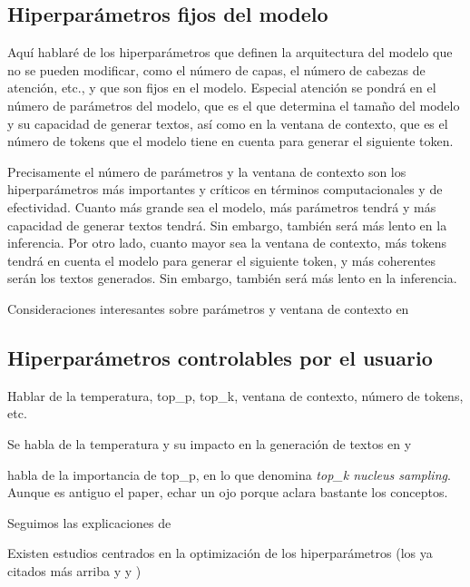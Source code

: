 \subsection{Hiperparámetros fijos del modelo}
Aquí hablaré de los hiperparámetros que definen la arquitectura del modelo que no se pueden modificar, como el número de capas, el número de cabezas de atención, etc., y que son fijos en el modelo. Especial atención se pondrá en el número de parámetros del modelo, que es el que determina el tamaño del modelo y su capacidad de generar textos, así como en la ventana de contexto, que es el número de tokens que el modelo tiene en cuenta para generar el siguiente token.

Precisamente el número de parámetros y la ventana de contexto son los hiperparámetros más importantes y críticos en términos computacionales y de efectividad. Cuanto más grande sea el modelo, más parámetros tendrá y más capacidad de generar textos tendrá. Sin embargo, también será más lento en la inferencia. Por otro lado, cuanto mayor sea la ventana de contexto, más tokens tendrá en cuenta el modelo para generar el siguiente token, y más coherentes serán los textos generados. Sin embargo, también será más lento en la inferencia.

Consideraciones interesantes sobre parámetros y ventana de contexto en \cite{gonzaloAsomandonosVentanaContextual2023}

\subsection{Hiperparámetros controlables por el usuario}
\label{sec:hiperparametros_controlables}
Hablar de la temperatura, top\_p, top\_k, ventana de contexto, número de tokens, etc. 

Se habla de la temperatura y su impacto en la generación de textos en \cite{holtzmanCuriousCaseNeural2020} y \cite{chamandFinetuneYourClassifier2022}

\cite{holtzmanCuriousCaseNeural2020} habla de la importancia de top\_p, en lo que denomina \textit{top\_k nucleus sampling}. Aunque es antiguo el paper, echar un ojo porque aclara bastante los conceptos.

Seguimos las explicaciones de \cite{rothmanTransformersNaturalLanguage2021}

Existen estudios centrados en la optimización de los hiperparámetros (los ya citados más arriba y \cite{wangCostEffectiveHyperparameterOptimization2023} y \cite{wangHyperparameterOptimizationAlgorithm2022})





